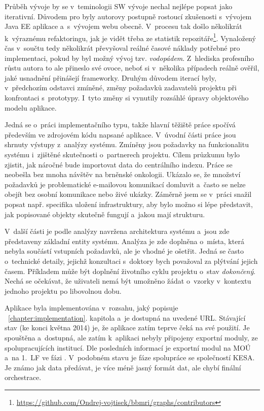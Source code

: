 \documentclass[11pt, draft, oneside]{fithesis2}
\begin{document}
Průběh vývoje by se v~teminologii SW vývoje nechal nejlépe popsat jako iterativní. Důvodem pro  byly autorovy postupně rostoucí zkušenosti s~vývojem Java EE aplikace a~s~vývojem webu obecně. V~procesu tak došlo několikrát k~výraznému refaktoringu, jak je vidět třeba ze statistik repozitáře\footnote{\url{https://github.com/Ondrej-vojtisek/bbmri/graphs/contributors}}. Vynaložený čas v~součtu tedy několikrát převyšoval reálné časové náklady potřebné pro implementaci, pokud by byl možný vývoj tzv. \textit{vodopádem}. Z~hlediska profesního růstu autora to ale přineslo své ovoce, neboť si v~několika případech reálně ověřil, jaké usnadnění přinášejí frameworky. Druhým důvodem iterací byly, v~předchozím odstavci zmíněné, změny požadavků zadavatelů projektu při konfrontaci s~prototypy. I~tyto změny si vynutily rozsáhlé úpravy objektového modelu aplikace. 

Jedná se o~práci implementačního typu, takže hlavní těžiště práce spočívá především ve zdrojovém kódu napsané aplikace. V~úvodní části práce jsou shrnuty výstupy z~analýzy systému. Zmíněny jsou požadavky na funkcionalitu systému i~zjištěné skutečnosti o~partnerech projektu. Cílem průzkumu bylo zjistit, jak náročné bude importovat data do centrálního indexu. 
Práce se neobešla bez mnoha návštěv na brněnské onkologii. Ukázalo se, že množství požadavků je problematické e-mailovou komunikací domluvit a~často se nelze obejít bez osobní komunikace nebo živé ukázky. Záměrně jsem se v~práci snažil popsat např. specifika uložení infrastruktury, aby bylo možno si lépe představit, jak popisované objekty skutečně fungují a~jakou mají strukturu. 

V~další části je podle analýzy navržena architektura systému a~jsou zde představeny základní entity systému. Analýza je zde doplněna o~místa, která nebyla součástí vstupních požadavků, ale je vhodné je ošetřit. Jedná se často o~technické detaily, jejichž konzultaci s~doktory bych považoval za plýtvání jejich časem. Příkladem může být doplnění životního cyklu projektu o~stav \textit{dokončený}. Nechá se očekávat, že uživateli nemá být umožněno žádat o~vzorky v~kontextu jednoho projektu po libovolnou dobu.

Aplikace byla implementována v~rozsahu, jaký popisuje ~\ref{chapter:implementation}. kapitola a~je dostupná na uvedené URL. Stávající stav (ke konci května 2014) je, že aplikace zatím teprve čeká na své  použití. Je spouštěna a~dostupná, ale zatím k~aplikaci nebyly připojeny exportní moduly, ze spolupracujících institucí. Dle posledních informací je exportní modul na MOÚ a~na 1.~LF ve fázi . V~podobném stavu je fáze spolupráce se společností KESA. Je známo jak data předávat, je více méně jasný formát dat, ale chybí finální orchestrace. 
\end{document}
